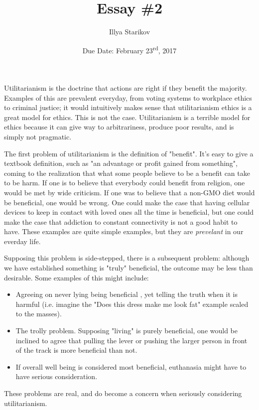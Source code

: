 \documentclass[12pt]{article}
\title{Essay \#2}
\date{Due Date: February 23\textsuperscript{rd}, 2017}
\author{Illya Starikov}
\newcommand{\source}[1]{\footnote{\url{#1}}}
\let\footnote=\endnote
\begin{document}
\maketitle

Utilitarianism is the doctrine that actions are right if they benefit the majority. Examples of this are prevalent everyday, from voting systems to workplace ethics to criminal justice; it would intuitively makes sense that utilitarianism ethics is a great model for ethics. This is not the case. Utilitarianism is a terrible model for ethics because it can give way to arbitrariness, produce poor results, and is simply not pragmatic.

The first problem of utilitarianism is the definition of "benefit". It's easy to give a textbook definition, such as "an advantage or profit gained from something"\source{http://www.dictionary.com/browse/benefit}, coming to the realization that what some people believe to be a benefit can take to be harm. If one is to believe that everybody could benefit from religion, one would be met by wide criticism. If one was to believe that a non-GMO diet would be beneficial, one would be wrong. One could make the case that having cellular devices to keep in contact with loved ones all the time is beneficial, but one could make the case that addiction to constant connectivity is not a good habit to have. These examples are quite simple examples, but they are \textit{prevelant} in our everday life.

Supposing this problem is side-stepped, there is a subsequent problem: although we have established something is "truly" beneficial, the outcome may be less than desirable. Some examples of this might include:

\begin{itemize}
    \item Agreeing on never lying being beneficial , yet telling the truth when it is harmful (i.e. imagine the "Does this dress make me look fat" example scaled to the masses).
    \item The trolly problem. Supposing "living" is purely beneficial, one would be inclined to agree that pulling the lever or pushing the larger person in front of the track is more beneficial than not.
    \item If overall well being is considered most beneficial, euthanasia might have to have serious consideration.
\end{itemize}

These problems are real, and do become a concern when seriously considering utilitarianism.
\end{document}
